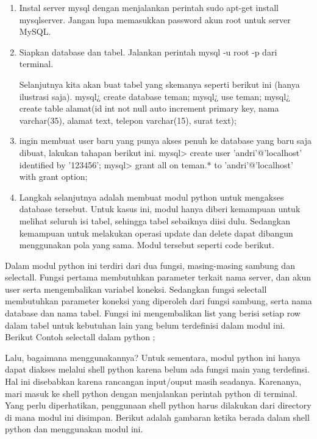 	\begin{enumerate}
		\item Instal server mysql dengan menjalankan perintah sudo apt-get install mysqlserver. Jangan lupa memasukkan password akun root untuk server MySQL. 
		\item Siapkan database dan tabel. Jalankan perintah mysql -u root -p dari terminal. 

			Selanjutnya kita akan buat tabel yang skemanya seperti berikut ini (hanya ilustrasi saja). 
			mysql¿ create database teman; 
			mysql¿ use teman; 
			mysql¿ create table alamat(id int not null auto increment primary key, nama varchar(35), alamat text, telepon varchar(15), surat text);

		\item  ingin membuat user baru yang punya akses penuh ke database yang baru saja dibuat, lakukan tahapan berikut ini. 
			mysql> create user 'andri'@'localhost' identified by '123456'; 	
			mysql> grant all on teman.* to 'andri'@'localhost' with grant option; 

		\item Langkah selanjutnya adalah membuat modul python untuk mengakses database tersebut. Untuk kasus ini, modul hanya diberi kemampuan untuk melihat seluruh isi tabel, sehingga tabel sebaiknya diisi dulu. Sedangkan kemampuan untuk melakukan operasi update dan delete dapat dibangun menggunakan pola yang sama. Modul tersebut seperti code berikut. 
	\end{enumerate}

Dalam modul python ini terdiri dari dua fungsi, masing-masing sambung dan selectall. Fungsi pertama membutuhkan parameter terkait nama server, dan akun user serta mengembalikan variabel koneksi. Sedangkan fungsi selectall membutuhkan parameter koneksi yang diperoleh dari fungsi sambung, serta nama database dan nama tabel. Fungsi ini mengembalikan list yang berisi setiap row dalam tabel untuk kebutuhan lain yang belum terdefinisi dalam modul ini. Berikut Contoh selectall dalam python ;



Lalu, bagaimana menggunakannya? Untuk sementara, modul python ini hanya dapat diakses melalui shell python karena belum ada fungsi main yang terdefinsi. Hal ini disebabkan karena rancangan input/ouput masih seadanya. Karenanya, mari masuk ke shell python dengan menjalankan perintah python di terminal. Yang perlu diperhatikan, penggunaan shell python harus dilakukan dari directory di mana modul ini disimpan. Berikut adalah gambaran ketika berada dalam shell python dan menggunakan modul ini. 



